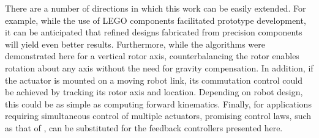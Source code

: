 \documentclass[journal]{IEEEtran}
\begin{document}
There are a number of directions in which this work can be easily extended. For example, while the use of LEGO components facilitated prototype development, it can be anticipated that refined designs fabricated from precision components will yield even better results. Furthermore, while the algorithms were demonstrated here for a vertical rotor axis, counterbalancing the rotor enables rotation about any axis without the need for gravity compensation. In addition, if the actuator is mounted on a moving robot link, its commutation control could be achieved by tracking its rotor axis and location. Depending on robot design, this could be as simple as computing forward kinematics. Finally, for applications requiring simultaneous control of multiple actuators, promising control laws, such as that of \cite{becker2014simultaneously}, can be substituted for the feedback controllers presented here. 



\end{document}
